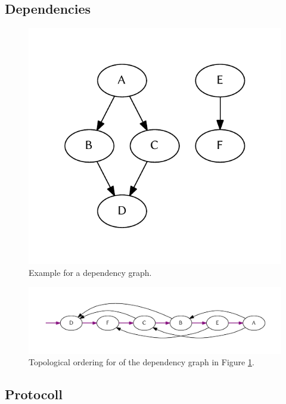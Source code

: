 		\subsection{Dependencies}
		\begin{figure}[!htb]
			\centering
			\includegraphics[width=.4474\textwidth]{figures/unordered-graph.pdf} %
			\caption{\label{fig:graph:unordered} Example for a dependency graph.}
		\end{figure}
		\begin{figure}[!htb]
			\centering
			\includegraphics[width=1\textwidth]{figures/ordered-graph.pdf} %
			\caption{\label{fig:graph:ordered} Topological ordering for of the dependency graph in Figure \ref{fig:graph:unordered}.}
		\end{figure}

		\subsection{Protocoll}
